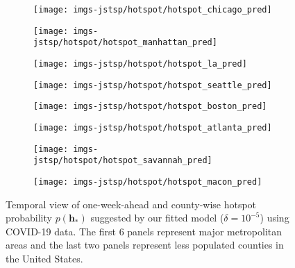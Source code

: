 \documentclass[journal]{IEEEtran}
\begin{document}
\begin{figure*}[!h]
\centering
\begin{subfigure}[h]{0.24\linewidth}
\texttt{[image: imgs-jstsp/hotspot/hotspot\_chicago\_pred]}
\end{subfigure}
\begin{subfigure}[h]{0.24\linewidth}
\texttt{[image: imgs-jstsp/hotspot/hotspot\_manhattan\_pred]}
\end{subfigure}
\begin{subfigure}[h]{0.24\linewidth}
\texttt{[image: imgs-jstsp/hotspot/hotspot\_la\_pred]}
\end{subfigure}
\begin{subfigure}[h]{0.24\linewidth}
\texttt{[image: imgs-jstsp/hotspot/hotspot\_seattle\_pred]}
\end{subfigure}
\vfill
\begin{subfigure}[h]{0.24\linewidth}
\texttt{[image: imgs-jstsp/hotspot/hotspot\_boston\_pred]}
\end{subfigure}
\begin{subfigure}[h]{0.24\linewidth}
\texttt{[image: imgs-jstsp/hotspot/hotspot\_atlanta\_pred]}
\end{subfigure}
\begin{subfigure}[h]{0.24\linewidth}
\texttt{[image: imgs-jstsp/hotspot/hotspot\_savannah\_pred]}
\end{subfigure}
\begin{subfigure}[h]{0.24\linewidth}
\texttt{[image: imgs-jstsp/hotspot/hotspot\_macon\_pred]}
\end{subfigure}
\caption{Temporal view of one-week-ahead and county-wise hotspot probability $p(\mathbf{h}_*)$ suggested by our fitted model ($\delta = 10^{-5}$) using COVID-19 data. The first 6 panels represent major metropolitan areas and the last two panels represent less populated counties in the United States.}
\label{fig:hotspot-time}
\end{figure*}
\end{document}
